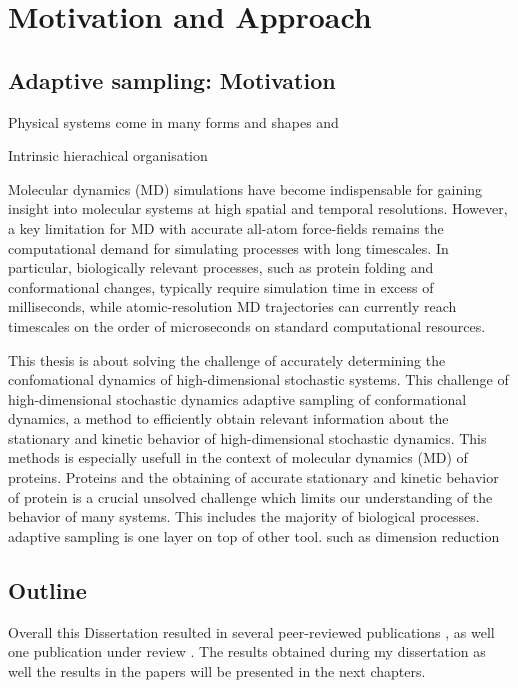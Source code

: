 \chapter{Motivation and Approach}

\section{Adaptive sampling: Motivation}
Physical systems come in many forms and shapes and 

Intrinsic hierachical organisation

Molecular dynamics (MD) simulations have become indispensable for gaining
insight into molecular systems at high spatial and temporal resolutions.
However, a key limitation for MD with accurate all-atom force-fields remains
the computational demand for simulating processes with long timescales. In
particular, biologically relevant processes, such as protein folding and
conformational changes, typically require simulation time in excess of
milliseconds, while atomic-resolution MD trajectories can currently reach
timescales on the order of microseconds on standard computational resources. 



This thesis is about solving the challenge of accurately determining the confomational dynamics of high-dimensional stochastic systems. This challenge of high-dimensional stochastic dynamics   
adaptive sampling of conformational dynamics, a method to efficiently obtain relevant information about the stationary and kinetic behavior of high-dimensional stochastic dynamics. This methods is especially usefull in the context of molecular dynamics (MD) of proteins. Proteins and the obtaining of accurate stationary and kinetic behavior of protein is a crucial unsolved challenge which limits our understanding of the behavior of many systems. This includes the majority of biological processes.
adaptive sampling is one layer on top 
of other tool. such as dimension reduction



\section{Outline}
 
Overall this Dissertation resulted in several peer-reviewed publications \cite{Adstrategies2018, Extasy2016}, as well one publication under review \cite{Extasy2019}. The results obtained during my dissertation as well the results in the papers will be presented in the next chapters.
 
